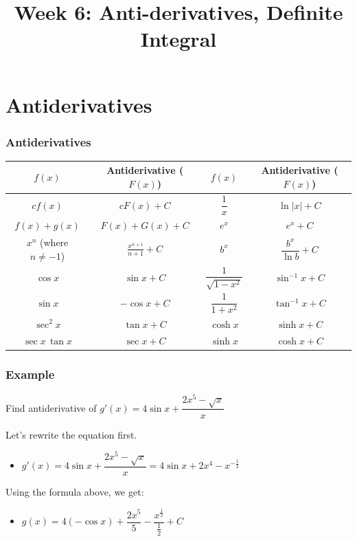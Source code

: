 \documentclass[t]{beamer}
\title{Week 6:  Anti-derivatives,  Definite Integral}
\theoremstyle{plain}
\theoremstyle{definition}
\newcommand{\ds}{\displaystyle}
\begin{document}
\frame{\titlepage}

\setcounter{tocdepth}{2}
\frame{\tableofcontents

}


\section{Antiderivatives}

\begin{frame}
\frametitle{Antiderivatives}

\footnotesize

\begin{center}
\renewcommand{\arraystretch}{1.5}
\begin{tabular}{| c | c || c | c |}
\hline
$f(x)$ & Antiderivative ($F(x)$) & $f(x)$ & Antiderivative ($F(x)$) \\
\hline
$cf(x)$ & $cF(x)+C$ & $\dfrac{1}{x}$ & $\ln{|x|} + C$\\
$f(x)+g(x)$ & $F(x)+G(x)+C$ & $e^{x}$ & $e^{x} + C$ \\
$x^n$ (where $n\neq-1$) & $\ds\frac{x^{n+1}}{n+1}+C$ & $b^{x}$ & $\dfrac{b^x}{\ln{b}} + C$ \\
$\cos x$ & $\sin x+C$ & $\dfrac{1}{\sqrt{1 - x^2}}$ & $\sin^{-1}x + C$  \\
$\sin x$ & $-\cos x+C$ & $\dfrac{1}{1 + x^2}$ & $\tan^{-1}x + C$ \\
$\sec^2 x$ & $\tan x+C$ & $\cosh{x}$ & $\sinh{x} + C$ \\
$\sec x\,\tan x$ & $\sec x + C$ & $\sinh{x}$ & $\cosh{x} + C$\\
\hline
\end{tabular}
\end{center}

\end{frame}


\begin{frame}

\frametitle{Example}

Find antiderivative of $g'(x) = 4 \sin{x} + \dfrac{2x^5 - \sqrt{x}}{x}$ \pause

\medskip

Let's rewrite the equation first.
\begin{itemize}
	\item $g'(x) = 4 \sin{x} + \dfrac{2x^5 - \sqrt{x}}{x} = 4\sin{x} + 2x^4 - x^{-\frac{1}{2}}$
\end{itemize}

\medskip

Using the formula above, we get:

\begin{itemize}
	\item $g(x) = 4(-\cos{x}) + \dfrac{2x^5}{5} - \dfrac{x^{\frac{1}{2}}}{\frac{1}{2}} + C$
\end{itemize}

\end{frame}
\end{document}

